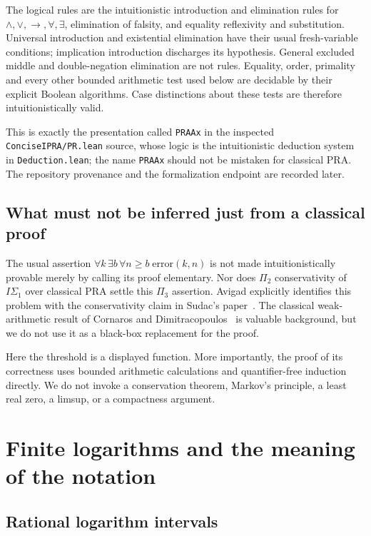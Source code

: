 \documentclass[11pt]{article}
\theoremstyle{definition}
\theoremstyle{remark}
\begin{document}
The logical rules are the intuitionistic introduction and elimination rules
for $\wedge,\vee,\to,\forall,\exists$, elimination of falsity, and equality
reflexivity and substitution. Universal introduction and existential
elimination have their usual fresh-variable conditions; implication
introduction discharges its hypothesis. General excluded middle and
double-negation elimination are not rules. Equality, order, primality and
every other bounded arithmetic test used below are decidable by their
explicit Boolean algorithms. Case distinctions about these tests are
therefore intuitionistically valid.

This is exactly the presentation called \texttt{PRAAx} in the inspected
\texttt{ConciseIPRA/PR.lean} source, whose logic is the intuitionistic
deduction system in \texttt{Deduction.lean}; the name \texttt{PRAAx} should
not be mistaken for classical PRA. The repository provenance and the
formalization endpoint are recorded later.

\subsection{What must not be inferred just from a classical proof}

The usual assertion
$\forall k\,\exists b\,\forall n\ge b\;\text{error}(k,n)$ is not made
intuitionistically provable merely by calling its proof elementary.
Nor does $\Pi_2$ conservativity of $I\Sigma_1$ over classical PRA settle
this $\Pi_3$ assertion. Avigad explicitly identifies this problem with the
conservativity claim in Sudac's paper~\cite{avigad,sudac}. The classical
weak-arithmetic result of Cornaros and Dimitracopoulos~\cite{cd} is valuable
background, but we do not use it as a black-box replacement for the proof.

Here the threshold is a displayed function. More importantly, the proof
of its correctness uses bounded arithmetic calculations and quantifier-free
induction directly. We do not invoke a conservation theorem, Markov's
principle, a least real zero, a limsup, or a compactness argument.

\section{Finite logarithms and the meaning of the notation}\label{sec:log}

\subsection{Rational logarithm intervals}
\end{document}
